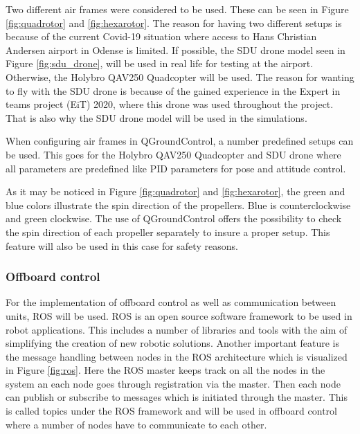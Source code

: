 \documentclass[../Head/report.tex]{subfiles}
\begin{document}
Two different air frames were considered to be used. These can be seen in Figure \ref{fig:quadrotor} and \ref{fig:hexarotor}. The reason for having two different setups is because of the current Covid-19 situation where access to Hans Christian Andersen airport in Odense is limited. If possible, the SDU drone model seen in Figure \ref{fig:sdu_drone}, will be used in real life for testing at the airport. Otherwise, the Holybro QAV250 Quadcopter will be used. The reason for wanting to fly with the SDU drone is because of the gained experience in the Expert in teams project (EiT) 2020, where this drone was used throughout the project. That is also why the SDU drone model will be used in the simulations. 

When configuring air frames in QGroundControl, a number predefined setups can be used. This goes for the Holybro QAV250 Quadcopter and SDU drone where all parameters are predefined like PID parameters for pose and attitude control.

As it may be noticed in Figure \ref{fig:quadrotor} and \ref{fig:hexarotor}, the green and blue colors illustrate the spin direction of the propellers. Blue is counterclockwise and green clockwise. The use of QGroundControl offers the possibility to check the spin direction of each propeller separately to insure a proper setup. This feature will also be used in this case for safety reasons.  

 
\subsubsection{Offboard control}
\label{sec:offboard_control}

For the implementation of offboard control as well as communication between units, ROS will be used. ROS is an open source software framework to be used in robot applications. This includes a number of libraries and tools with the aim of simplifying the creation of new robotic solutions. Another important feature is the message handling between nodes in the ROS architecture which is visualized in Figure \ref{fig:ros}. Here the ROS master keeps track on all the nodes in the system an each node goes through registration via the master. Then each node can publish or subscribe to messages which is initiated through the master. This is called topics under the ROS framework and will be used in offboard control where a number of nodes have to communicate to each other.
\end{document}
